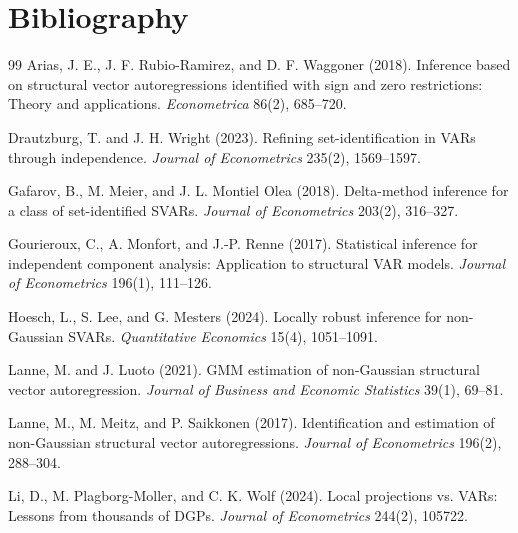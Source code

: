 \documentclass[11pt]{article}
\theoremstyle{definition}
\theoremstyle{plain}
\theoremstyle{remark}
\begin{document}
\section*{Bibliography}
\begin{thebibliography}{99}
Arias, J. E., J. F. Rubio-Ramirez, and D. F. Waggoner (2018).
Inference based on structural vector autoregressions identified with sign and
zero restrictions: Theory and applications. \emph{Econometrica} 86(2), 685--720.

Drautzburg, T. and J. H. Wright (2023).
Refining set-identification in VARs through independence. \emph{Journal of
Econometrics} 235(2), 1569--1597.

Gafarov, B., M. Meier, and J. L. Montiel Olea (2018).
Delta-method inference for a class of set-identified SVARs. \emph{Journal of
Econometrics} 203(2), 316--327.

Gourieroux, C., A. Monfort, and J.-P. Renne (2017).
Statistical inference for independent component analysis: Application to
structural VAR models. \emph{Journal of Econometrics} 196(1), 111--126.

Hoesch, L., S. Lee, and G. Mesters (2024).
Locally robust inference for non-Gaussian SVARs. \emph{Quantitative Economics}
15(4), 1051--1091.

Lanne, M. and J. Luoto (2021).
GMM estimation of non-Gaussian structural vector autoregression.
\emph{Journal of Business and Economic Statistics} 39(1), 69--81.

Lanne, M., M. Meitz, and P. Saikkonen (2017).
Identification and estimation of non-Gaussian structural vector
autoregressions. \emph{Journal of Econometrics} 196(2), 288--304.

Li, D., M. Plagborg-Moller, and C. K. Wolf (2024).
Local projections vs. VARs: Lessons from thousands of DGPs. \emph{Journal of
Econometrics} 244(2), 105722.


\end{thebibliography}
\end{document}
